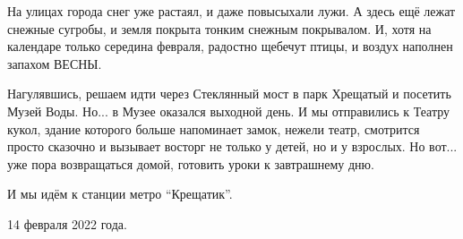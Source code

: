 На улицах города снег уже растаял, и даже повысыхали лужи. А здесь ещё лежат
снежные сугробы, и земля покрыта тонким снежным покрывалом. И, хотя на календаре
только середина февраля, радостно щебечут птицы, и воздух наполнен  запахом
ВЕСНЫ.


Нагулявшись, решаем идти через Стеклянный мост в парк Хрещатый и посетить Музей
Воды. Но... в Музее оказался выходной день. И мы отправились к Театру
кукол, здание которого больше напоминает замок, нежели театр, смотрится просто
сказочно и вызывает восторг не только у детей, но и у взрослых. Но вот... уже
пора возвращаться домой, готовить уроки к завтрашнему дню.


И мы идём к станции метро \enquote{Крещатик}.

14 февраля 2022 года.
